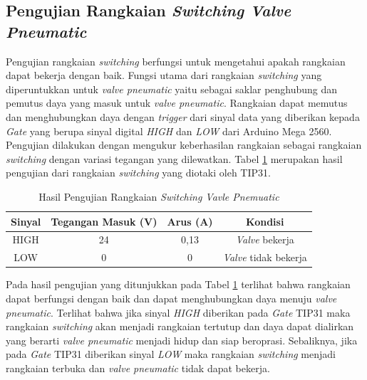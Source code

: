 \subsection{Pengujian Rangkaian \textit{Switching Valve Pneumatic}}
Pengujian rangkaian \textit{switching} berfungsi untuk mengetahui apakah rangkaian dapat bekerja dengan baik. Fungsi utama dari rangkaian \textit{switching} yang diperuntukkan untuk \textit{valve pneumatic} yaitu sebagai saklar penghubung dan pemutus daya yang masuk untuk \textit{valve pneumatic}. Rangkaian dapat memutus dan menghubungkan daya dengan \textit{trigger} dari sinyal data yang diberikan kepada \textit{Gate} yang berupa sinyal digital \textit{HIGH} dan \textit{LOW} dari Arduino Mega 2560. Pengujian dilakukan dengan mengukur keberhasilan rangkaian sebagai rangkaian \textit{switching} dengan variasi tegangan yang dilewatkan. Tabel \ref{tbl.rangkaiantip} merupakan hasil pengujian dari rangkaian \textit{switching} yang diotaki oleh TIP31.
\begin{table}[H]
	\centering
	\caption{Hasil Pengujian Rangkaian \textit{Switching Vavle Pnemuatic}}
	\label{tbl.rangkaiantip}
	\begin{tabular}{|c|c|c|c|}
		\hline
		\rowcolor[HTML]{9B9B9B} 
		Sinyal & Tegangan Masuk (V) & Arus (A) & Kondisi             \\ \hline
		HIGH   & 24                 & 0,13     & \textit{Valve} bekerja       \\ \hline
		LOW    & 0                  & 0      & \textit{Valve} tidak bekerja \\ \hline
	\end{tabular}
	
\end{table} 

Pada hasil pengujian yang ditunjukkan pada Tabel \ref{tbl.rangkaiantip} terlihat bahwa rangkaian dapat berfungsi dengan baik dan dapat menghubungkan daya menuju \textit{valve pneumatic}. Terlihat bahwa jika sinyal \textit{HIGH} diberikan pada \textit{Gate} TIP31 maka rangkaian \textit{switching} akan menjadi rangkaian tertutup dan daya dapat dialirkan yang berarti \textit{valve pneumatic} menjadi hidup dan siap beroprasi. Sebaliknya, jika pada \textit{Gate} TIP31 diberikan sinyal \textit{LOW} maka rangkaian \textit{switching} menjadi rangkaian terbuka dan \textit{valve pneumatic} tidak dapat bekerja.
	


